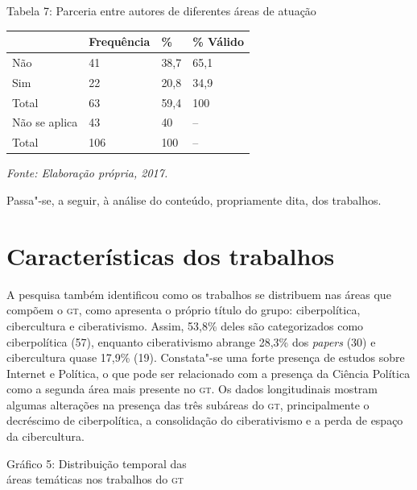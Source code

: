 \pagebreak
\begin{center}
Tabela 7: Parceria entre autores de diferentes áreas de atuação
\end{center}

\begin{center}
\begin{tabular}{|l|l|l|l|}
\hline
 & \textbf{Frequência} & \textbf{\%} & \textbf{\% Válido} \\ \hline
Não & 41 & 38,7 & 65,1 \\ \hline
Sim & 22 & 20,8 & 34,9 \\ \hline
Total & 63 & 59,4 & 100 \\ \hline
Não se aplica & 43 & 40 & -- \\ \hline
Total & 106 & 100 & -- \\ \hline
\end{tabular}
\end{center}

\begin{center}
{\footnotesize\emph{Fonte: Elaboração própria, 2017.}}
\end{center}

Passa"-se, a seguir, à análise do conteúdo, propriamente dita, dos
trabalhos.

\section{Características dos trabalhos}

A pesquisa também identificou como os trabalhos se distribuem nas áreas
que compõem o \textsc{gt}, como apresenta o próprio título do grupo:
ciberpolítica, cibercultura e ciberativismo. Assim, 53,8\% deles são
categorizados como ciberpolítica (57), enquanto ciberativismo abrange
28,3\% dos \emph{papers} (30) e cibercultura quase 17,9\% (19).
Constata"-se uma forte presença de estudos sobre Internet e Política, o
que pode ser relacionado com a presença da Ciência Política como a
segunda área mais presente no \textsc{gt}. Os dados longitudinais mostram algumas
alterações na presença das três subáreas do \textsc{gt}, principalmente o
decréscimo de ciberpolítica, a consolidação do ciberativismo e a perda
de espaço da cibercultura.

\pagebreak
\begin{center}
Gráfico 5: Distribuição temporal das\\ áreas temáticas nos trabalhos do \textsc{gt}
\end{center}

